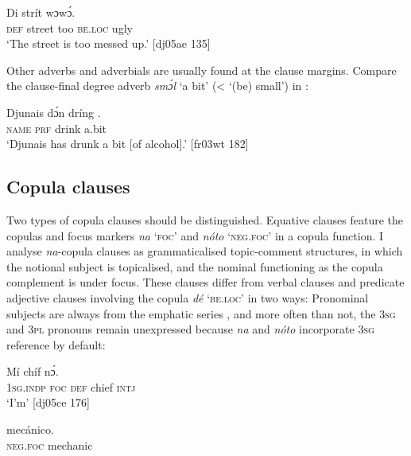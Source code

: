 \ea%
    \label{ex:key:522}
    \gll \textsc{D}i  strít          wɔwɔ́.\\
\textsc{def}  street  too  \textsc{be.loc}  ugly\\

\glt ‘The street is too messed up.’ [dj05ae 135]
\z

Other adverbs and adverbials are usually found at the clause margins. Compare the clause-final degree adverb \textit{smɔ́l} ‘a bit’ (< ‘(be) small’) in :


\ea%
    \label{ex:key:523}
    \gll Djunais  dɔ́n  dríng  .\\
\textsc{name}  \textsc{prf}  drink  a.bit\\

\glt ‘Djunais has drunk a bit [of alcohol].’ [fr03wt 182]
\z

\subsection{Copula clauses}

Two types of copula clauses should be distinguished. Equative clauses feature the copulas and focus markers \textit{na} \textsc{‘foc’} and \textit{nóto} \textsc{‘neg.foc’} in a copula function. I analyse \textit{na}{}-copula clauses as grammaticalised topic-comment structures, in which the notional subject is topicalised, and the nominal functioning as the copula complement is under focus. These clauses differ from verbal clauses and predicate adjective clauses involving the copula \textit{dé} ‘\textsc{be.loc}’ in two ways: Pronominal subjects are always from the emphatic series , and more often than not, the \textsc{3sg} and \textsc{3pl} pronouns remain unexpressed  because \textit{na} and \textit{nóto} incorporate \textsc{3sg} reference by default:


\ea%
    \label{ex:key:524}
    \gll Mí       chíf    nɔ́.\\
\textsc{1sg.indp}  \textsc{foc}  \textsc{def}  chief  \textsc{intj}\\

\glt ‘I’m’ [dj05ce 176]
\z


\ea%
    \label{ex:key:525}
    \gll {}  mecánico.\\
\textsc{neg}.\textsc{foc}  mechanic\\

